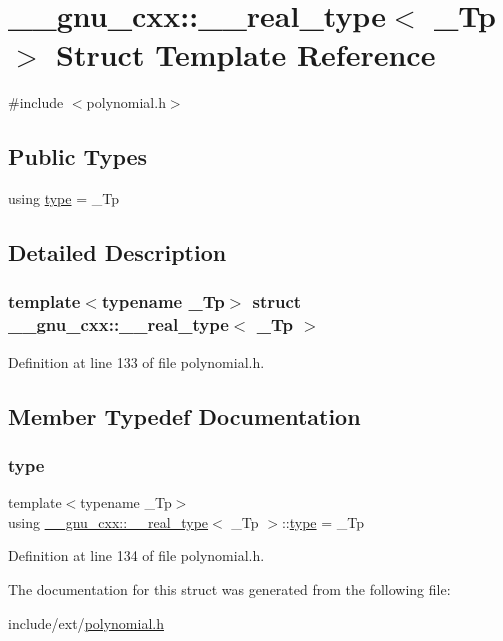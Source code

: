 \hypertarget{struct____gnu__cxx_1_1____real__type}{}\section{\+\_\+\+\_\+gnu\+\_\+cxx\+:\+:\+\_\+\+\_\+real\+\_\+type$<$ \+\_\+\+Tp $>$ Struct Template Reference}
\label{struct____gnu__cxx_1_1____real__type}


{\ttfamily \#include $<$polynomial.\+h$>$}

\subsection*{Public Types}
\begin{DoxyCompactItemize}
\item 
using \hyperlink{struct____gnu__cxx_1_1____real__type_a39bc08f342aaa6ef7e02c6711c611b74}{type} = \+\_\+\+Tp
\end{DoxyCompactItemize}


\subsection{Detailed Description}
\subsubsection*{template$<$typename \+\_\+\+Tp$>$\newline
struct \+\_\+\+\_\+gnu\+\_\+cxx\+::\+\_\+\+\_\+real\+\_\+type$<$ \+\_\+\+Tp $>$}



Definition at line 133 of file polynomial.\+h.



\subsection{Member Typedef Documentation}
\mbox{\label{struct____gnu__cxx_1_1____real__type_a39bc08f342aaa6ef7e02c6711c611b74}} 
\subsubsection{\texorpdfstring{type}{type}}
{\footnotesize\ttfamily template$<$typename \+\_\+\+Tp$>$ \\
using \hyperlink{struct____gnu__cxx_1_1____real__type}{\+\_\+\+\_\+gnu\+\_\+cxx\+::\+\_\+\+\_\+real\+\_\+type}$<$ \+\_\+\+Tp $>$\+::\hyperlink{struct____gnu__cxx_1_1____real__type_a39bc08f342aaa6ef7e02c6711c611b74}{type} =  \+\_\+\+Tp}



Definition at line 134 of file polynomial.\+h.



The documentation for this struct was generated from the following file\+:\begin{DoxyCompactItemize}
\item 
include/ext/\hyperlink{polynomial_8h}{polynomial.\+h}\end{DoxyCompactItemize}
